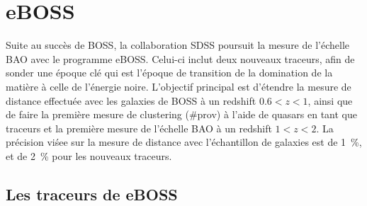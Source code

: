 \section{eBOSS}

Suite au succès de BOSS, la collaboration SDSS poursuit la mesure de l'échelle BAO avec le programme eBOSS. Celui-ci inclut deux nouveaux traceurs, afin de sonder une époque clé qui est l'époque de transition de la domination de la matière à celle de l'énergie noire.
L'objectif principal est d'étendre la mesure de distance effectuée avec les galaxies de BOSS à un redshift $\num{0,6} < z < \num{1}$, ainsi que de faire la première mesure de clustering (\#prov) à l'aide de quasars en tant que traceurs et la première mesure de l'échelle BAO à un redshift $1 < z < 2$.
La précision viśee sur la mesure de distance avec l'échantillon de galaxies est de \SI{1}{\percent}, et de \SI{2}{\percent} pour les nouveaux traceurs.



\subsection{Les traceurs de eBOSS}

